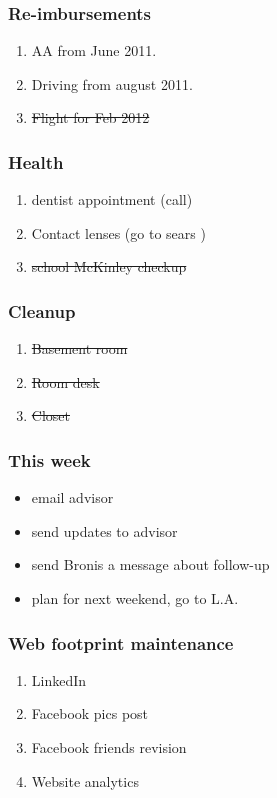 \begin{frame}
\frametitle{Re-imbursements} 
\begin{enumerate} 
\item \small AA from June 2011. 
\item \small Driving from august 2011. 
\item \small \sout{Flight for Feb 2012}
\end{enumerate} 
\end{frame} 

\begin{frame} 
\frametitle{Health} 
\begin{enumerate}
\item dentist appointment (call)
\item Contact lenses (go to sears )
\item \sout{school McKinley checkup}
\end{enumerate}
\end{frame} 

\begin{frame}
\frametitle{Cleanup}
\begin{enumerate}
\item \sout{Basement room}
\item \sout{Room desk}
\item \sout{Closet}
\end{enumerate} 
\end{frame}

\begin{frame}
\frametitle{This week}
\begin{itemize}
\item email advisor
\item send updates to advisor
\item send Bronis a message about follow-up
\item plan for next weekend, go to L.A. 
\end{itemize} 
\end{frame}

















\begin{frame} 
\frametitle{Web footprint maintenance}
\begin{enumerate} 
\item \small LinkedIn
\item \small Facebook pics post
\item \small Facebook friends revision
\item \small Website analytics 
\end{enumerate} 
\end{frame} 





